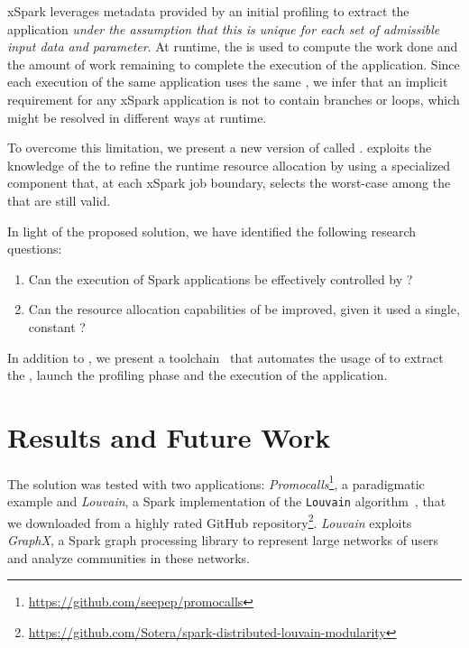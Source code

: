 xSpark leverages metadata provided by an initial profiling to  extract the application \plan \textit{under the assumption that this \plan is unique for each set of admissible input data and parameter}. At runtime, the \plan is used to compute the work done and the amount of work remaining to complete the execution of the application. Since each execution of the same application uses the same \plan, we infer that an implicit requirement for any xSpark application is not to contain branches or loops, which might be resolved in different ways at runtime.

To overcome this limitation, we present a new version of \cSpark called \tool. %
\tool exploits the knowledge of the \model to refine the runtime resource allocation by using a specialized component that, at each xSpark job boundary, selects the worst-case \plan among the \plans that are still valid.

In light of the proposed solution, we have identified the following research questions:

\begin{enumerate}[\boldmath$RQ_1 : $] 
	\item Can the execution of Spark applications be effectively controlled by \tool?
	\item Can the resource allocation capabilities of \cSpark be improved, given it used a single, constant \plan?
\end{enumerate}

In addition to \tool, we present a toolchain~\cite{misc:xSparkDagsymb} that automates the usage of  \dSymb to extract the \model, launch the profiling phase and the execution of the application. 

\section*{Results and Future Work}\label{sec:results_future_works}
The solution was tested with two applications:  \textit{Promocalls}\footnote{\url{https://github.com/seepep/promocalls}}, a paradigmatic example and \textit{Louvain}, a Spark implementation of the \texttt{Louvain} algorithm~\cite{Louvain}, that we downloaded from a highly rated GitHub repository\footnote{\url{https://github.com/Sotera/spark-distributed-louvain-modularity}}. \textit{Louvain} exploits \textit{GraphX}, a Spark graph processing library to represent large networks of users and analyze communities in these networks. 


